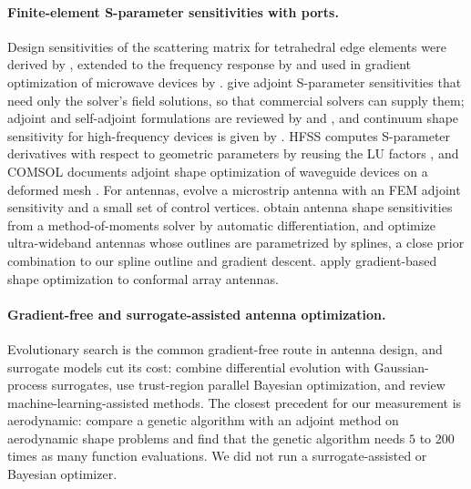 \documentclass{anvil-paper}
\begin{document}
\paragraph{Finite-element S-parameter sensitivities with ports.}
Design sensitivities of the scattering matrix for tetrahedral edge elements
were derived by \citet{webb2000design}, extended to the frequency response
by \citet{webb2002design} and used in gradient optimization of microwave
devices by \citet{nair2003optimization}. \citet{georgieva2002feasible} give
adjoint S-parameter sensitivities that need only the solver's field
solutions, so that commercial solvers can supply them; adjoint and
self-adjoint formulations are reviewed by \citet{nikolova2004adjoint} and
\citet{nikolova2006network}, and continuum shape sensitivity for
high-frequency devices is given by \citet{choi2011generalized}. HFSS computes
S-parameter derivatives with respect to geometric parameters by reusing the
LU factors \citep{ansys_hfss_derivatives,vardapetyan2008sensitivity}, and
COMSOL documents adjoint shape optimization of waveguide devices on a
deformed mesh \citep{comsol_sensitivity_method,jensen2022comsolshape}. For
antennas, \citet{ghassemi2013antenna} evolve a microstrip antenna with an FEM
adjoint sensitivity and a small set of control vertices.
\citet{toivanen2009electromagnetic} obtain antenna shape sensitivities from a
method-of-moments solver by automatic differentiation, and
\citet{toivanen2010gradient} optimize ultra-wideband antennas whose outlines
are parametrized by splines, a close prior combination to our spline
outline and gradient descent. \citet{jacobsson2010gradient} apply
gradient-based shape optimization to conformal array antennas.

\paragraph{Gradient-free and surrogate-assisted antenna optimization.}
Evolutionary search is the common gradient-free route in antenna design, and
surrogate models cut its cost: \citet{liu2014efficient} combine differential
evolution with Gaussian-process surrogates, \citet{zhou2021trust} use
trust-region parallel Bayesian optimization, and \citet{akinsolu2020machine}
review machine-learning-assisted methods. The closest precedent for our
measurement is aerodynamic: \citet{zingg2008comparative} compare a genetic
algorithm with an adjoint method on aerodynamic shape problems and find that the
genetic algorithm needs $5$ to $200$ times as many function evaluations. We
did not run a surrogate-assisted or Bayesian optimizer.
\end{document}
